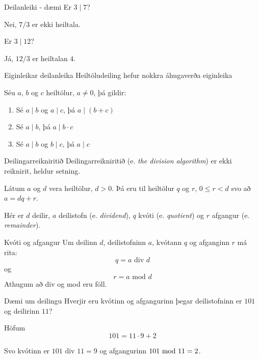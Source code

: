 \documentclass[handout]{beamer}
\begin{document}
\begin{frame}{Deilanleiki - dæmi}
Er $3\mid 7$? \pause

Nei, $7/3$ er ekki heiltala. \pause

\vspace{0.5cm}
Er $3\mid 12$? \pause

Já, $12/3$ er heiltalan $4$.
\end{frame}

\begin{frame}{Eiginleikar deilanleika}
Heiltöludeiling hefur nokkra áhugaverða eiginleika
\begin{tcolorbox}[title=Eiginleikar deilanleika]
Séu $a$, $b$ og $c$ heiltölur, $a \neq 0$, þá gildir:
\begin{enumerate}
 \item Sé $a\mid b$ og $a\mid c$, þá $a\mid (b+c)$
 \item Sé $a\mid b$, þá $a\mid b\cdot c$
 \item Sé $a\mid b$ og $b\mid c$, þá $a\mid c$
\end{enumerate}
\end{tcolorbox}
\end{frame}

\begin{frame}{Deilingarreikniritið}
Deilingarreikniritið (e. \emph{the division algorithm}) er ekki reiknirit, heldur setning.

\begin{tcolorbox}[title=Deilingarreikniritið]
Látum $a$ og $d$ vera heiltölur, $d > 0$. 
Þá eru til heiltölur $q$ og $r$, $0 \leq r < d$ svo að $a = dq +r$.
\end{tcolorbox}

Hér er $d$ deilir, $a$ deilistofn (e. \emph{dividend}), $q$ kvóti (e. \emph{quotient}) og $r$ afgangur (e. \emph{remainder}).
\end{frame}


\begin{frame}{Kvóti og afgangur}
Um deilinn $d$, deilistofninn $a$, kvótann $q$ og afganginn $r$ má rita:
\[
 q = a \text{ div } d
\]
og
\[
 r = a \text{ mod } d
\]
Athugum að div og mod eru föll.
\end{frame}

\begin{frame}{Dæmi um deilingu}
Hverjir eru kvótinn og afgangurinn þegar deilistofninn er $101$ og deilirinn $11$?\pause

Höfum
\[
 101 = 11 \cdot 9 + 2
\]

Svo kvótinn er $101 \text{ div } 11 = 9$ og afgangurinn $101 \ \text{mod}\ 11 = 2$.

\end{frame}
\end{document}
